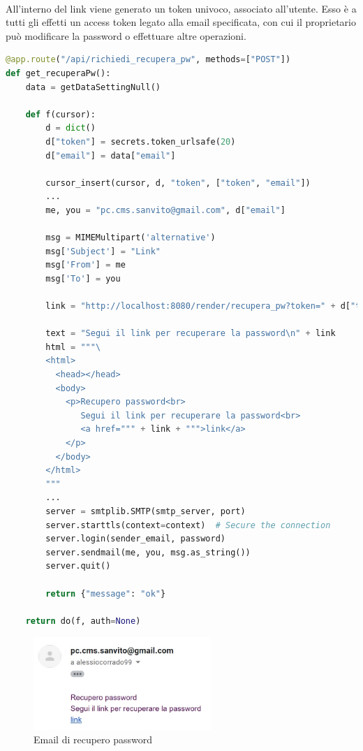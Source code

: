 \documentclass[12pt,a4paper,twoside,english,italian]{book}
\begin{document}
\paragraph{} All'interno del link viene generato un token univoco, associato all'utente. Esso è a tutti gli effetti un access token legato alla email specificata, con cui il proprietario può modificare la password o effettuare altre operazioni.  

\begin{lstlisting}[language=Python, caption=endpoint richiedi\_recupera\_pw]
@app.route("/api/richiedi_recupera_pw", methods=["POST"])
def get_recuperaPw():
    data = getDataSettingNull()

    def f(cursor):
        d = dict()
        d["token"] = secrets.token_urlsafe(20)
        d["email"] = data["email"]

        cursor_insert(cursor, d, "token", ["token", "email"])
        ...
        me, you = "pc.cms.sanvito@gmail.com", d["email"]

        msg = MIMEMultipart('alternative')
        msg['Subject'] = "Link"
        msg['From'] = me
        msg['To'] = you

        link = "http://localhost:8080/render/recupera_pw?token=" + d["token"]

        text = "Segui il link per recuperare la password\n" + link
        html = """\
        <html>
          <head></head>
          <body>
            <p>Recupero password<br>
               Segui il link per recuperare la password<br>
               <a href=""" + link + """>link</a>
            </p>
          </body>
        </html>
        """
        ...
        server = smtplib.SMTP(smtp_server, port)
        server.starttls(context=context)  # Secure the connection
        server.login(sender_email, password)
        server.sendmail(me, you, msg.as_string())
        server.quit()

        return {"message": "ok"}

    return do(f, auth=None)
\end{lstlisting}


\begin{figure}[H]
    \centering
    \includegraphics[width=0.6\textwidth]{img/email_recupero.jpg}
    \caption{Email di recupero password}
\end{figure}
\end{document}

